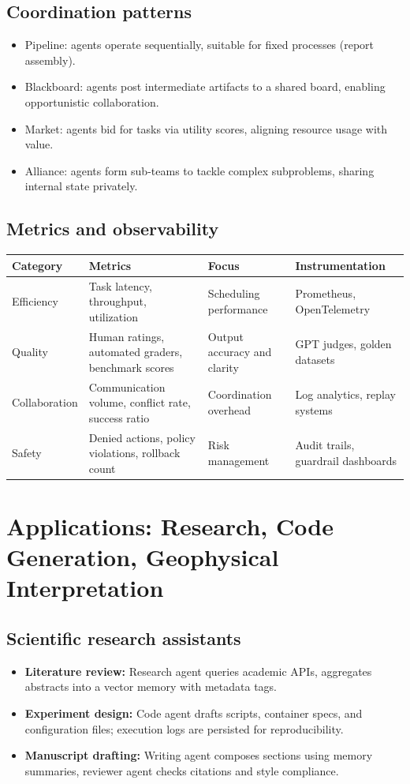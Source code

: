 \documentclass{article}
\begin{document}
\subsection{Coordination patterns}
\begin{itemize}
  \item Pipeline: agents operate sequentially, suitable for fixed processes (report assembly).
  \item Blackboard: agents post intermediate artifacts to a shared board, enabling opportunistic collaboration.
  \item Market: agents bid for tasks via utility scores, aligning resource usage with value.
  \item Alliance: agents form sub-teams to tackle complex subproblems, sharing internal state privately.
\end{itemize}

\subsection{Metrics and observability}
\begin{longtable}{p{3cm}p{3cm}p{4cm}p{4cm}}
\toprule
Category & Metrics & Focus & Instrumentation \\
\midrule
Efficiency & Task latency, throughput, utilization & Scheduling performance & Prometheus, OpenTelemetry \\
Quality & Human ratings, automated graders, benchmark scores & Output accuracy and clarity & GPT judges, golden datasets \\
Collaboration & Communication volume, conflict rate, success ratio & Coordination overhead & Log analytics, replay systems \\
Safety & Denied actions, policy violations, rollback count & Risk management & Audit trails, guardrail dashboards \\
\bottomrule
\end{longtable}

\section{Applications: Research, Code Generation, Geophysical Interpretation}
\subsection{Scientific research assistants}
\begin{itemize}
  \item \textbf{Literature review:} Research agent queries academic APIs, aggregates abstracts into a vector memory with metadata tags.
  \item \textbf{Experiment design:} Code agent drafts scripts, container specs, and configuration files; execution logs are persisted for reproducibility.
  \item \textbf{Manuscript drafting:} Writing agent composes sections using memory summaries, reviewer agent checks citations and style compliance.
\end{itemize}
\end{document}
